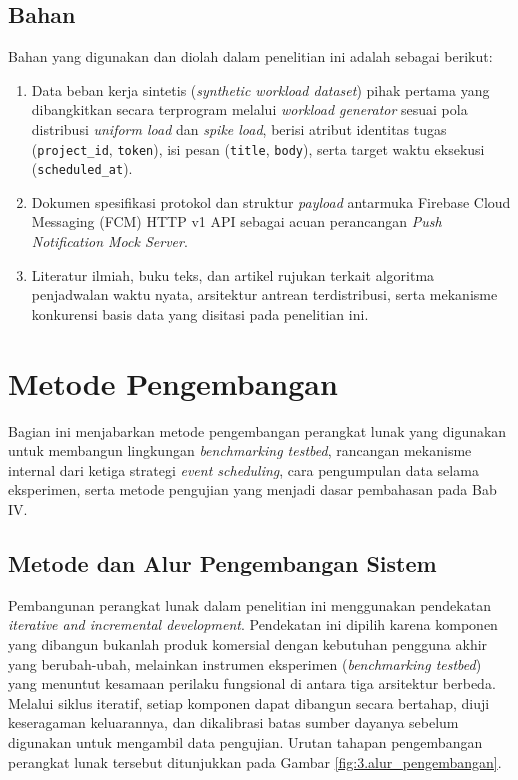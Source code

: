 \subsection{Bahan} \label{III.Bahan}
Bahan yang digunakan dan diolah dalam penelitian ini adalah sebagai berikut: \par
\begin{enumerate}[noitemsep]
	\item Data beban kerja sintetis (\textit{synthetic workload dataset}) pihak pertama yang dibangkitkan secara terprogram melalui \textit{workload generator} sesuai pola distribusi \textit{uniform load} dan \textit{spike load}, berisi atribut identitas tugas (\texttt{project\_id}, \texttt{token}), isi pesan (\texttt{title}, \texttt{body}), serta target waktu eksekusi (\texttt{scheduled\_at}).
	\item Dokumen spesifikasi protokol dan struktur \textit{payload} antarmuka Firebase Cloud Messaging (FCM) HTTP v1 API sebagai acuan perancangan \textit{Push Notification Mock Server}.
	\item Literatur ilmiah, buku teks, dan artikel rujukan terkait algoritma penjadwalan waktu nyata, arsitektur antrean terdistribusi, serta mekanisme konkurensi basis data yang disitasi pada penelitian ini.
\end{enumerate}

\section{Metode Pengembangan} \label{III.Metode}
Bagian ini menjabarkan metode pengembangan perangkat lunak yang digunakan untuk membangun lingkungan \textit{benchmarking testbed}, rancangan mekanisme internal dari ketiga strategi \textit{event scheduling}, cara pengumpulan data selama eksperimen, serta metode pengujian yang menjadi dasar pembahasan pada Bab IV. \par

\subsection{Metode dan Alur Pengembangan Sistem} \label{III.Alur_Pengembangan}
Pembangunan perangkat lunak dalam penelitian ini menggunakan pendekatan \textit{iterative and incremental development}. Pendekatan ini dipilih karena komponen yang dibangun bukanlah produk komersial dengan kebutuhan pengguna akhir yang berubah-ubah, melainkan instrumen eksperimen (\textit{benchmarking testbed}) yang menuntut kesamaan perilaku fungsional di antara tiga arsitektur berbeda. Melalui siklus iteratif, setiap komponen dapat dibangun secara bertahap, diuji keseragaman keluarannya, dan dikalibrasi batas sumber dayanya sebelum digunakan untuk mengambil data pengujian. Urutan tahapan pengembangan perangkat lunak tersebut ditunjukkan pada Gambar \ref{fig:3.alur_pengembangan}. \par

